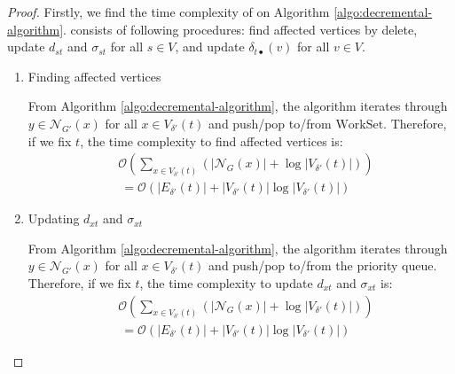 \begin{proof}
  Firstly, we find the time complexity of  on Algorithm \ref{algo:decremental-algorithm}.
   consists of following procedures: find affected vertices by delete, update $d_{st}$ and $\sigma_{st}$ for all $s\in V$, and update $\delta_{t\bullet}(v)$ for all $v\in V$.
  
  \begin{enumerate}[label=(\alph*)]
  \item Finding affected vertices
    \par From Algorithm \ref{algo:decremental-algorithm}, the algorithm iterates through $y\in\mathcal{N}_{G'}(x)$ for all $x\in V_{\delta'}(t)$ and push/pop to/from $\text{WorkSet}$.
    Therefore, if we fix $t$, the time complexity to find affected vertices is:
    \begin{equation}
      \begin{aligned}
        &\mathcal{O}(\sum_{x\in V_{\delta'}(t)}(\lvert\mathcal{N}_G(x)\rvert
        +\log\lvert V_{\delta'}(t)\rvert)) \nonumber\\
        &\:=\mathcal{O}(\lvert E_{\delta'}(t)\rvert
        +\lvert V_{\delta'}(t)\rvert\log\lvert V_{\delta'}(t)\rvert) \nonumber
      \end{aligned}
    \end{equation}

  \item Updating $d_{xt}$ and $\sigma_{xt}$
    \par From Algorithm \ref{algo:decremental-algorithm}, the algorithm iterates through $y\in\mathcal{N}_{G'}(x)$ for all $x\in V_{\delta'}(t)$ and push/pop to/from the priority queue.
    Therefore, if we fix $t$, the time complexity to update $d_{xt}$ and $\sigma_{xt}$ is:
    \begin{equation}
      \begin{aligned}
        &\mathcal{O}(\sum_{x\in V_{\delta'}(t)}(\lvert\mathcal{N}_G(x)\rvert
        +\log\lvert V_{\delta'}(t)\rvert)) \nonumber\\
        &\:=\mathcal{O}(\lvert E_{\delta'}(t)\rvert
        +\lvert V_{\delta'}(t)\rvert\log\lvert V_{\delta'}(t)\rvert) \nonumber
      \end{aligned}
    \end{equation}
    

\end{enumerate}
\end{proof}
